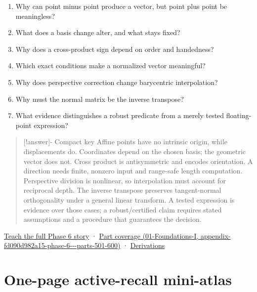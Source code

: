 \begin{enumerate}
\def\labelenumi{\arabic{enumi}.}
\tightlist
\item
  Why can point minus point produce a vector, but point plus point be meaningless?
\item
  What does a basis change alter, and what stays fixed?
\item
  Why does a cross-product sign depend on order and handedness?
\item
  Which exact conditions make a normalized vector meaningful?
\item
  Why does perspective correction change barycentric interpolation?
\item
  Why must the normal matrix be the inverse transpose?
\item
  What evidence distinguishes a robust predicate from a merely tested floating-point expression?
\end{enumerate}

\begin{quote}
{[}!answer{]}- Compact key Affine points have no intrinsic origin, while displacements do. Coordinates depend on the chosen basis; the geometric vector does not. Cross product is antisymmetric and encodes orientation. A direction needs finite, nonzero input and range-safe length computation. Perspective division is nonlinear, so interpolation must account for reciprocal depth. The inverse transpose preserves tangent-normal orthogonality under a general linear transform. A tested expression is evidence over those cases; a robust/certified claim requires stated assumptions and a procedure that guarantees the decision.
\end{quote}

\href{Continuous\%20Notes/Computing\%20Foundations\%20-\%20From\%20Bits\%20to\%20C++\%20and\%20Systems\%20APIs\#The\%20panel\%20gives\%20us\%20a\%20reason\%20to\%20learn}{Teach the full Phase 6 story} · \href{../01-Foundations-I/main.pdf\#nameddest=appendix-fd090d982a15-phase-6---parts-501-600}{Part coverage (01-Foundations-I, appendix-fd090d982a15-phase-6-\/-\/-parts-501-600)} · \href{Continuous\%20Notes/Computing\%20Foundations\%20-\%20From\%20Bits\%20to\%20C++\%20and\%20Systems\%20APIs\#Phase\%206\%20-\%20Geometry\%20reconstruction\%20proofs}{Derivations}

\section{One-page active-recall mini-atlas}\label{appendix-38d9c8aca357-one-page-active-recall-mini-atlas}

